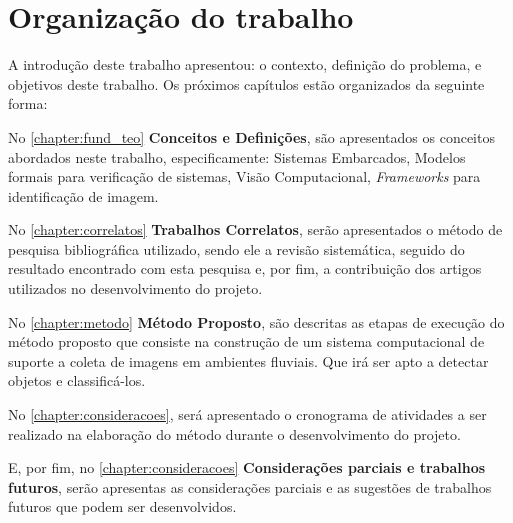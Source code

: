 \section{Organização do trabalho}
A introdução deste trabalho apresentou: o contexto, definição do problema, e objetivos deste trabalho. Os próximos capítulos estão organizados da seguinte forma:

\par
No \autoref{chapter:fund_teo} \textbf{Conceitos e Definições}, são apresentados os conceitos abordados neste trabalho, especificamente: Sistemas Embarcados, Modelos formais para verificação de sistemas, Visão Computacional, \textit{Frameworks} para identificação de imagem.

\par
No \autoref{chapter:correlatos} \textbf{Trabalhos Correlatos}, serão apresentados o método de pesquisa bibliográfica utilizado, sendo ele a revisão sistemática, seguido do resultado encontrado com esta pesquisa e, por fim, a contribuição dos artigos utilizados no desenvolvimento do projeto.
\par
No \autoref{chapter:metodo} \textbf{Método Proposto}, são descritas as etapas de execução do método proposto que consiste na construção de um sistema computacional de suporte a coleta de imagens em ambientes fluviais. Que irá ser apto a detectar objetos e classificá-los.

\par
No \autoref{chapter:consideracoes}, será apresentado o cronograma de atividades a ser realizado na elaboração do método durante o desenvolvimento do projeto.

\par

\par
E, por fim, no \autoref{chapter:consideracoes} \textbf{Considerações parciais e trabalhos futuros}, serão apresentas as considerações parciais e as sugestões de trabalhos futuros que podem ser desenvolvidos.